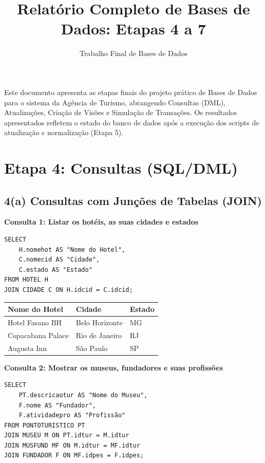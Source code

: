 \documentclass[11pt, a4paper]{article}
\title{\textbf{Relatório Completo de Bases de Dados: Etapas 4 a 7}}
\author{Trabalho Final de Bases de Dados}
\date{}
\begin{document}
\maketitle

Este documento apresenta as etapas finais do projeto prático de Bases de Dados para o sistema da Agência de Turismo, abrangendo Consultas (DML), Atualizações, Criação de Visões e Simulação de Transações. Os resultados apresentados refletem o estado do banco de dados após a execução dos scripts de atualização e normalização (Etapa 5).

\section{Etapa 4: Consultas (SQL/DML)}

\subsection{4(a) Consultas com Junções de Tabelas (JOIN)}

\textbf{Consulta 1: Listar os hotéis, as suas cidades e estados}
\begin{lstlisting}
SELECT 
    H.nomehot AS "Nome do Hotel", 
    C.nomecid AS "Cidade", 
    C.estado AS "Estado"
FROM HOTEL H
JOIN CIDADE C ON H.idcid = C.idcid;
\end{lstlisting}

\begin{table}[h]
\centering
\begin{tabular}{lll}
\toprule
\textbf{Nome do Hotel} & \textbf{Cidade} & \textbf{Estado} \\
\midrule
Hotel Fasano BH & Belo Horizonte & MG \\
Copacabana Palace & Rio de Janeiro & RJ \\
Augusta Inn & São Paulo & SP \\
\bottomrule
\end{tabular}
\end{table}

\textbf{Consulta 2: Mostrar os museus, fundadores e suas profissões}
\begin{lstlisting}
SELECT
    PT.descricaotur AS "Nome do Museu",
    F.nome AS "Fundador",
    F.atividadepro AS "Profissão"
FROM PONTOTURISTICO PT
JOIN MUSEU M ON PT.idtur = M.idtur
JOIN MUSFUND MF ON M.idtur = MF.idtur
JOIN FUNDADOR F ON MF.idpes = F.idpes;
\end{lstlisting}
\end{document}
